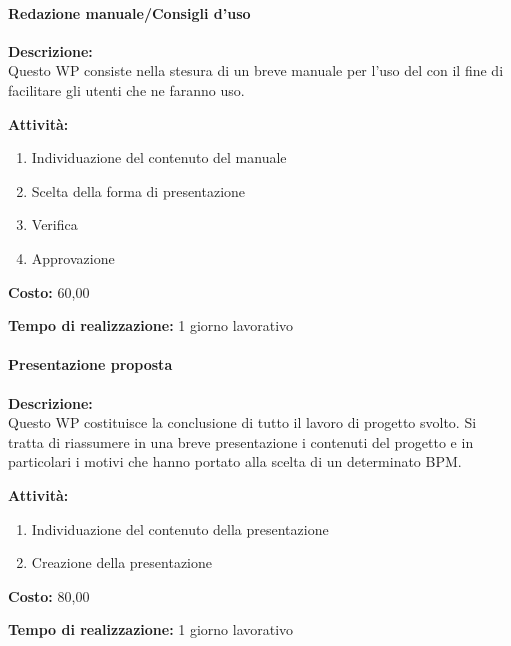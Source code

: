 \paragraph{Redazione manuale/Consigli d'uso}
\begin{description}
\item{\bfseries Descrizione:}\\
Questo WP consiste nella stesura di un breve manuale per l'uso del  con il fine di facilitare gli utenti che ne faranno uso.

\item  {\bfseries Attività:}
	\begin{enumerate}
	\item Individuazione del contenuto del manuale
	\item Scelta della forma di presentazione
	\item Verifica 
 	\item Approvazione	
	\end{enumerate}

\item  {\bfseries Costo:} \text{\euro} 60,00 
\item  {\bfseries Tempo di realizzazione:}  1 giorno lavorativo
\end{description}

\paragraph{Presentazione proposta}
\begin{description}
	\item{\bfseries Descrizione:}\\
Questo WP costituisce la conclusione di tutto il lavoro di progetto svolto. Si tratta di 		riassumere in una breve presentazione i contenuti del progetto e in particolari i motivi che hanno portato alla scelta di un determinato  BPM.

	\item  {\bfseries Attività:}
	\begin{enumerate}
		\item Individuazione del contenuto della presentazione
		\item Creazione della presentazione
	\end{enumerate}
	\item{\bfseries Costo:} \text{\euro} 80,00 
	\item{\bfseries Tempo di realizzazione:}  1 giorno lavorativo
\end{description}

